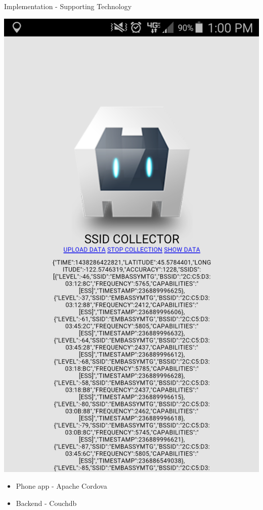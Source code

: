 \documentclass[11pt]{beamer}
\begin{document}
\begin{frame}{Implementation - Supporting Technology}

    \includegraphics[height=0.7\textheight]{pictures/phoneapp.png}
    \begin{itemize}
        \item Phone app - Apache Cordova
        \item Backend - Couchdb
    \end{itemize}

\end{frame}
\end{document}
